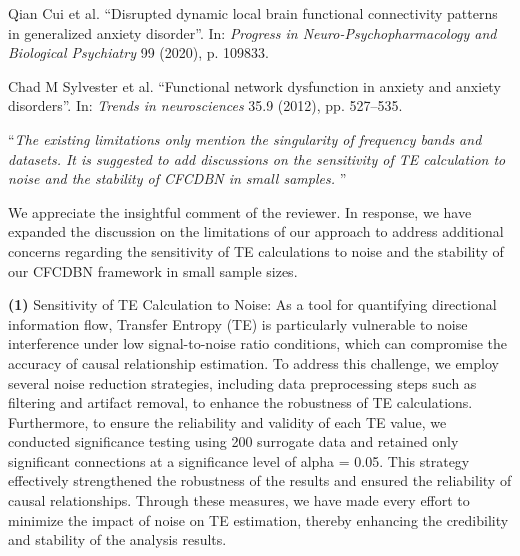 \documentclass[12pt,technote,onecolumn]{IEEEtran}
\begin{document}
\noindent[24]\:Qian Cui et al. ``Disrupted dynamic local brain functional connectivity patterns in generalized anxiety disorder”. In: \textit{Progress in Neuro-Psychopharmacology and Biological Psychiatry} 99 (2020), p. 109833.

\noindent[25]\:Chad M Sylvester et al. ``Functional network dysfunction in anxiety and anxiety disorders”. In: \textit{Trends in neurosciences} 35.9 (2012), pp. 527–535.


\vspace{4mm} 

 ``{\it The existing limitations only mention the singularity of frequency bands and datasets. It is suggested to add discussions on the sensitivity of TE calculation to noise and the stability of CFCDBN in small samples.
}''
\vspace{1mm}


We appreciate the insightful comment of the reviewer. In response, we have expanded the discussion on the limitations of our approach to address additional concerns regarding the sensitivity of TE calculations to noise and the stability of our CFCDBN framework in small sample sizes. 

\textbf{(1)} Sensitivity of TE Calculation to Noise:
As a tool for quantifying directional information flow, Transfer Entropy (TE) is particularly vulnerable to noise interference under low signal-to-noise ratio conditions, which can compromise the accuracy of causal relationship estimation. To address this challenge, we employ several noise reduction strategies, including data preprocessing steps such as filtering and artifact removal, to enhance the robustness of TE calculations. Furthermore, to ensure the reliability and validity of each TE value, we conducted significance testing using 200 surrogate data and retained only significant connections at a significance level of alpha = 0.05. This strategy effectively strengthened the robustness of the results and ensured the reliability of causal relationships. Through these measures, we have made every effort to minimize the impact of noise on TE estimation, thereby enhancing the credibility and stability of the analysis results.
\end{document}
